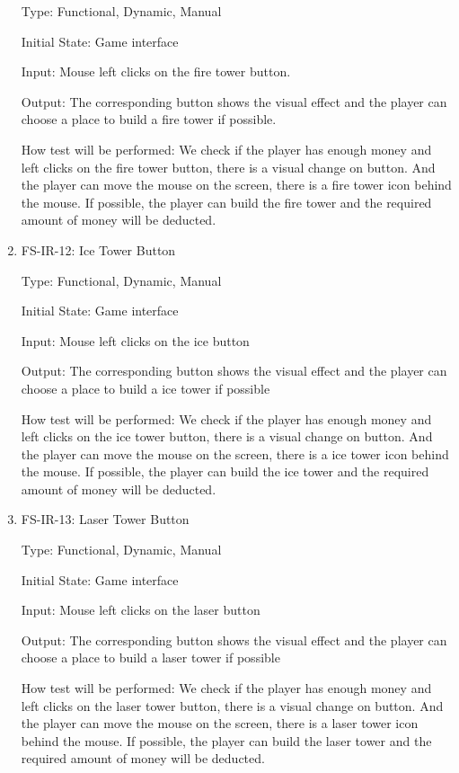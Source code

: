 \documentclass[12pt]{article}
\begin{document}
\begin{enumerate}
	Type: Functional, Dynamic, Manual
					
	Initial State: Game interface
					
	Input: Mouse left clicks on the fire tower button.
					
	Output: The corresponding button shows the visual effect and the player can choose a place to build a fire tower if possible.
					
	How test will be performed: We check if the player has enough money and left clicks on the fire tower button, there is a visual change on button. And the player can move the mouse on the screen, there is a fire tower icon behind the mouse. If possible, the player can build the fire tower and the required amount of money will be deducted.
	
	\item{FS-IR-12: Ice Tower Button}
					
	Type: Functional, Dynamic, Manual
					
	Initial State: Game interface
					
	Input: Mouse left clicks on the ice button
					
	Output: The corresponding button shows the visual effect and the player can choose a place to build a ice tower if possible
					
	How test will be performed: We check if the player has enough money and left clicks on the ice tower button, there is a visual change on button. And the player can move the mouse on the screen, there is a ice tower icon behind the mouse. If possible, the player can build the ice tower and the required amount of money will be deducted.
	
	\item{FS-IR-13: Laser Tower Button}
					
	Type: Functional, Dynamic, Manual
					
	Initial State: Game interface
					
	Input: Mouse left clicks on the laser button
					
	Output: The corresponding button shows the visual effect and the player can choose a place to build a laser tower if possible
					
	How test will be performed: We check if the player has enough money and left clicks on the laser tower button, there is a visual change on button. And the player can move the mouse on the screen, there is a laser tower icon behind the mouse. If possible, the player can build the laser tower and the required amount of money will be deducted.
	

\end{enumerate}
\end{document}
